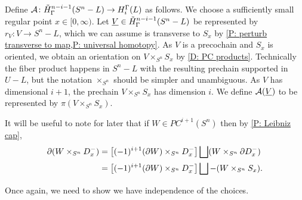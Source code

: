 \begin{example}
\begin{comment}
We next construct a locally collapsing map near $L$.
Let $\eta \colon [0,\infty) \to [0,\infty)$ be a smooth map that
\begin{itemize}
\item $\eta([0,1]) = 0$,
\item $\eta$ is strictly increasing on $[1,2]$, and
\item $\eta(x)=x$ for $x \geq 2$.
\end{itemize}
We then define $\rho \colon S^n \to S^n$ such that
\begin{itemize}
\item $\rho(x) = x$ if $x \in S^n - (\sqcup U_i)$,x
\item $\rho(x) = \eta(d(x))x$ if $x \in \sqcup U_i$, where $d(x)$ is the distance from the origin in the fiber of the bundle $U_i$ containing $x$, and $\eta(d(x))x$ is similarly the scalar multiplication in the fiber.
\end{itemize}
By construction, $\rho$ is the identity map outside of $\sqcup U_i$, it is a diffeomorphism from $S^n-D_1$ onto $S^n-L$, and it retracts $D_1$ onto $L$ by the bundle projection.
\end{comment}


Define $\mathcal{A} \colon \tilde H^{n-i-1}_\Gamma(S^n-L) \to H_i^\Gamma(L)$ as follows.
We choose a sufficiently small regular point $x \in [0,\infty)$.
Let $\underline{V} \in \tilde H^{n-i-1}_\Gamma(S^n-L)$ be represented by $r_V \colon V \to S^n - L$, which we can assume is transverse to $S_x$ by \cref{P: perturb transverse to map,P: universal homotopy}.
As $V$ is a precochain and $S_x$ is oriented, we obtain an orientation on $V \times_{S^n} S_x$ by \cref{D: PC products}.
Technically the fiber product happens in $S^n-L$ with the resulting prechain supported in $U-L$, but the notation $\times_{S^n}$ should be simpler and unambiguous.
As $V$ has dimensional $i+1$, the prechain $V \times_{S^n} S_x$ has dimension $i$.
We define $\mathcal{A}(\underline{V})$ to be represented by $\pi(V \times_{S^n} S_x)$.

It will be useful to note for later that if $W \in PC^{i+1}(S^n)$ then by \cref{P: Leibniz cap},
\begin{align}
\partial (W \times_{S^n} D_x^-) &= \left[(-1)^{i+1} (\partial W) \times_{S^n} D_x^-\right] \bigsqcup (W \times_{S^n} \partial D_x^-)\notag\\
&= \left[(-1)^{i+1} (\partial W) \times_{S^n} D_x^-\right] \bigsqcup - (W \times_{S^n} S_x). \label{E: leib bd}
\end{align}

Once again, we need to show we have independence of the choices.


\end{example}
